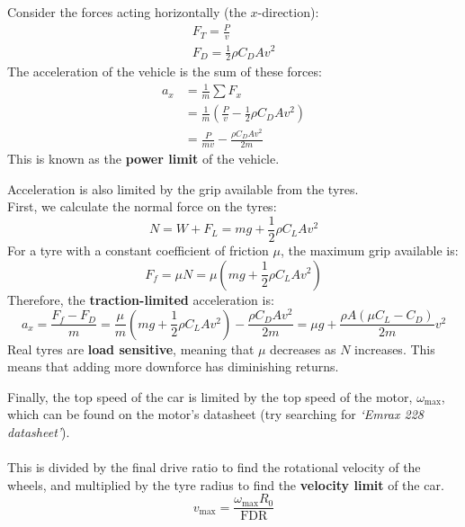 \begin{frame}
    Consider the forces acting horizontally (the $x$-direction):
    \begin{gather*}
        F_T = \frac{P}{v} \\
        F_D = \frac{1}{2} \rho C_D A v^2
    \end{gather*}
    The acceleration of the vehicle is the sum of these forces:
    \begin{align*}
        a_x &= \frac{1}{m} \sum F_x \\
        &= \frac{1}{m} \left(\frac{P}{v} - \frac{1}{2} \rho C_D A v^2\right) \\
        &= \frac{P}{mv} - \frac{\rho C_D A v^2}{2m}
    \end{align*}
    This is known as the \textbf{power limit} of the vehicle.
\end{frame}

\begin{frame}
    Acceleration is also limited by the grip available from the tyres. \\
    First, we calculate the normal force on the tyres:
    $$N = W + F_L = mg + \frac{1}{2} \rho C_L A v^2$$
    For a tyre with a constant coefficient of friction $\mu$, the maximum grip available is:
    $$F_f = \mu N = \mu \left(mg + \frac{1}{2} \rho C_L A v^2\right)$$
    Therefore, the \textbf{traction-limited} acceleration is:
    $$a_x = \frac{F_f - F_D}{m}
    = \frac{\mu}{m} \left(mg + \frac{1}{2} \rho C_L A v^2\right) - \frac{\rho C_D A v^2}{2m}
    = \mu g + \frac{\rho A(\mu C_L - C_D)}{2m} v^2$$
    Real tyres are \textbf{load sensitive},
    meaning that $\mu$ decreases as $N$ increases.
    This means that adding more downforce has diminishing returns.
\end{frame}

\begin{frame}
    Finally, the top speed of the car is limited
    by the top speed of the motor, $\omega_\text{max}$,
    which can be found on the motor's datasheet
    (try searching for \textit{`Emrax 228 datasheet'}). \\~\\
    This is divided by the final drive ratio
    to find the rotational velocity of the wheels,
    and multiplied by the tyre radius to find the
    \textbf{velocity limit} of the car.
    $$v_\text{max} = \frac{\omega_\text{max} R_0}{\text{FDR}}$$
\end{frame}

